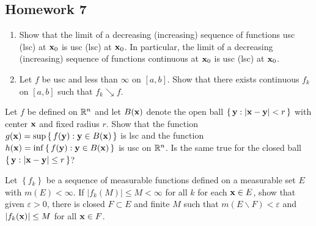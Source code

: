 \subsection{Homework 7}
\begin{problem}
  \hfill
  \begin{enumerate}[label=(\alph*),noitemsep]
  \item Show that the limit of a decreasing (increasing) sequence of
    functions usc (lsc) at $\mathbf{x}_0$ is usc (lsc) at $\mathbf{x}_0$. In
    particular, the limit of a decreasing (increasing) sequence of
    functions continuous at $\mathbf{x}_0$ is usc (lsc) at $\mathbf{x}_0$.
  \item Let $f$ be usc and less than $\infty$ on $[a,b]$. Show that there
    exists continuous $f_k$ on $[a,b]$ such that $f_k\searrow f$.
  \end{enumerate}
\end{problem}
\begin{solution}
\end{solution}

\begin{problem}
  Let $f$ be defined on $\mathbb{R}^n$ and let $B(\mathbf{x})$ denote the open ball
  $\left\{\,\mathbf{y}:|\mathbf{x}-\mathbf{y}|<r\,\right\}$ with center $\mathbf{x}$ and fixed
  radius $r$. Show that the function
  $g(\mathbf{x})=\sup\left\{\,f(\mathbf{y}):\mathbf{y}\in B(\mathbf{x})\,\right\}$ is lsc and the
  function $h(\mathbf{x})=\inf\left\{\,f(\mathbf{y}):\mathbf{y}\in B(\mathbf{x})\,\right\}$ is usc
  on $\mathbb{R}^n$. Is the same true for the closed ball
  $\left\{\,\mathbf{y}:|\mathbf{x}-\mathbf{y}|\leq r\,\right\}$?
\end{problem}
\begin{solution}
\end{solution}

\begin{problem}
  Let $\left\{f_k\right\}$ be a sequence of measurable functions defined on
  a measurable set $E$ with $m(E)<\infty$. If $|f_k(M)|\leq M<\infty$ for
  all $k$ for each $\mathbf{x}\in E$, show that given $\varepsilon>0$, there is
  closed $F\subset E$ and finite $M$ such that
  $m(E\smallsetminus F)<\varepsilon$ and $|f_k(\mathbf{x})|\leq M$ for all
  $\mathbf{x}\in F$.
\end{problem}
\begin{solution}
\end{solution}

